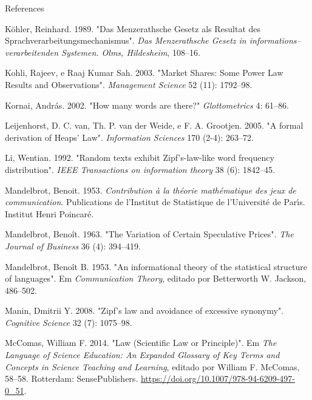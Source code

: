 \documentclass[
  ignorenonframetext,
  aspectratio=169]{beamer}
\newlength{\cslhangindent}
\newlength{\cslentryspacingunit} %
\newenvironment{CSLReferences}[2] %
 {%
  \setlength{\parindent}{0pt}
  \ifodd #1
  \let\oldpar\par
  \def\par{\hangindent=\cslhangindent\oldpar}
  \fi
  \setlength{\parskip}{#2\cslentryspacingunit}
 }%
 {}
\begin{document}
\begin{frame}[allowframebreaks]{References}
\begin{CSLReferences}{1}{0}
\leavevmode{}%
Köhler, Reinhard. 1989. {"Das Menzerathsche Gesetz als Resultat des
Sprachverarbeitungsmechanismus"}. \emph{Das Menzerathsche Gesetz in
informations--verarbeitenden Systemen. Olms, Hildesheim}, 108--16.

\leavevmode{}%
Kohli, Rajeev, e Raaj Kumar Sah. 2003. {"Market Shares: Some Power Law
Results and Observations"}. \emph{Management Science} 52 (11): 1792--98.

\leavevmode{}%
Kornai, András. 2002. {"How many words are there?"} \emph{Glottometrics}
4: 61--86.

\leavevmode{}%
Leijenhorst, D. C. van, Th. P. van der Weide, e F. A. Grootjen. 2005.
{"A formal derivation of {H}eaps' Law"}. \emph{Information Sciences} 170
(2-4): 263--72.

\leavevmode{}%
Li, Wentian. 1992. {"Random texts exhibit Zipf's-law-like word frequency
distribution"}. \emph{IEEE Transactions on information theory} 38 (6):
1842--45.

\leavevmode{}%
Mandelbrot, Benoit. 1953. \emph{Contribution {à} la th{é}orie
math{é}matique des jeux de communication}. Publications de l'Institut de
Statistique de l'Universit{é} de Par{ı́}s. Institut Henri Poincar{é}.

\leavevmode{}%
Mandelbrot, Benoît. 1963. {"The Variation of Certain Speculative
Prices"}. \emph{The Journal of Business} 36 (4): 394--419.

\leavevmode{}%
Mandelbrot, Benoît B. 1953. {"An informational theory of the statistical
structure of languages"}. Em \emph{Communication Theory}, editado por
Betterworth W. Jackson, 486--502.

\leavevmode{}%
Manin, Dmitrii Y. 2008. {"Zipf's law and avoidance of excessive
synonymy"}. \emph{Cognitive Science} 32 (7): 1075--98.

\leavevmode{}%
McComas, William F. 2014. {"Law (Scientific Law or Principle)"}. Em
\emph{The Language of Science Education: An Expanded Glossary of Key
Terms and Concepts in Science Teaching and Learning}, editado por
William F. McComas, 58--58. Rotterdam: SensePublishers.
\url{https://doi.org/10.1007/978-94-6209-497-0_51}.


\end{CSLReferences}
\end{frame}
\end{document}
